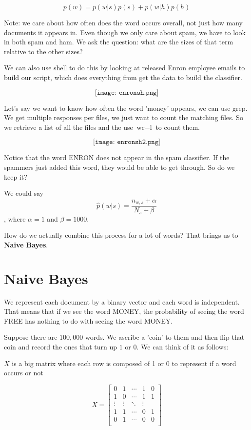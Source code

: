 $$p(w) = p(w | s)p(s) + p(w |h)p(h)$$

Note: we care about how often does the word occurs overall, not just how many documents it appears in. Even though we only care about spam, we have to look in both spam and ham. We ask the question: what are the sizes of that term relative to the other sizes?

We can also use shell to do this by looking at released Enron employee emails to build our script, which does everything from get the data to build the classifier. 

$$\texttt{[image: enronsh.png]}$$

Let's say we want to know how often the word 'money' appears, we can use grep. We get multiple responses per files, we just want to count the matching files. So we retrieve a list of all the files and the use $\text{wc} - \text{l}$ to count them. 

$$\texttt{[image: enronsh2.png]}$$

Notice that the word ENRON does not appear in the spam classifier. If the spammers just added this word, they would be able to get through. So do we keep it?

We could say $$\hat{p}(w|s) = \frac{n_{w, s} + \alpha}{N_{s} + \beta}$$, where $\alpha = 1$ and $\beta = 1000$.

How do we actually combine this process for a lot of words? That brings us to \textbf{Naive Bayes}. 

\section{Naive Bayes}

We represent each document by a binary vector and each word is independent. That means that if we see the word MONEY, the probability of seeing the word FREE has nothing to do with seeing the word MONEY.

Suppose there are $100,000$ words. We ascribe a 'coin' to them and then flip that coin and record the ones that turn up $1$ or $0$. We can think of it as follows:

$X$ is a big matrix where each row is composed of 1 or 0 to represent if a word occurs or not 

$$X =
\begin{bmatrix}
  0 & 1& \cdots &1 & 0 \\
  1 & 0& \cdots &1 & 1 \\
  \vdots & \vdots & \ddots & \vdots\\
  1 & 1& \cdots &0 & 1 \\
  0 & 1& \cdots &0 & 0 \\
\end{bmatrix}
$$


